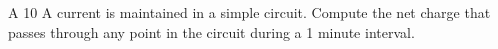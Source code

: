 A 10 A current is maintained in a simple circuit. %
Compute the net charge that passes through any point in the circuit during a 
1 minute interval.